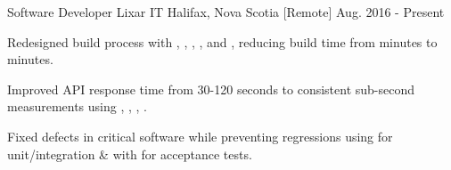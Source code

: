 

\begin{cventries}

  \cventry
    {Software Developer} %
    {Lixar IT} %
    {Halifax, Nova Scotia [Remote]} %
    {Aug. 2016 - Present} %
    {
      \begin{cvitems} %
  \item {Redesigned build process with , , , , and , reducing build time from  minutes to  minutes.}
  \item {Improved API response time from 30-120 seconds to consistent sub-second measurements using , , , .}
  \item {Fixed defects in critical software while preventing regressions using  for unit/integration \&  with  for acceptance tests.}
      \end{cvitems}
    }


\end{cventries}
